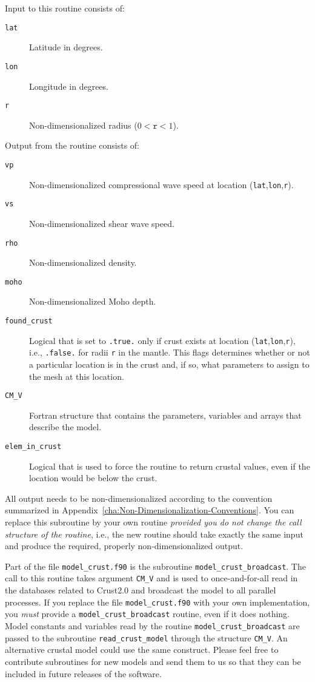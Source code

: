 \noindent
Input to this routine consists of:
\begin{description}
\item [{\texttt{lat}}] Latitude in degrees.
\item [{\texttt{lon}}] Longitude in degrees.
\item [{\texttt{r}}] Non-dimensionalized radius ($0<\texttt{r}<1$).
\end{description}
%
Output from the routine consists of:
\begin{description}
\item [{\texttt{vp}}] Non-dimensionalized compressional wave speed at location
(\texttt{lat},\texttt{lon},\texttt{r}).
\item [{\texttt{vs}}] Non-dimensionalized shear wave speed.
\item [{\texttt{rho}}] Non-dimensionalized density.
\item [{\texttt{moho}}] Non-dimensionalized Moho depth.
\item [{\texttt{found\_crust}}] Logical that is set to \texttt{.true.}
only if crust exists at location (\texttt{lat},\texttt{lon},\texttt{r}),
i.e., \texttt{.false.} for radii \texttt{r} in the mantle. This flags
determines whether or not a particular location is in the crust and,
if so, what parameters to assign to the mesh at this location.
\item [{\texttt{CM\_V}}] Fortran structure that contains the parameters,
variables and arrays that describe the model.
\item [{\texttt{elem\_in\_crust}}] Logical that is used to force the
routine to return crustal values, even if the location would
be below the crust.
\end{description}


All output needs to be non-dimensionalized according to the convention
summarized in Appendix~\ref{cha:Non-Dimensionalization-Conventions}.
You can replace this subroutine by your own routine \textit{provided
you do not change the call structure of the routine}, i.e., the new
routine should take exactly the same input and produce the required,
properly non-dimensionalized output.\newline


Part of the file \texttt{model\_crust.f90} is the subroutine \texttt{model\_crust\_broadcast}.
The call to this routine takes argument \texttt{CM\_V} and is used
to once-and-for-all read in the databases related to Crust2.0 and
broadcast the model to all parallel processes. If
you replace the file \texttt{model\_crust.f90} with your own implementation,
you \textit{must} provide a \texttt{model\_crust\_broadcast} routine,
even if it does nothing. Model constants and variables read by the
routine \texttt{model\_crust\_broadcast} are passed to the subroutine
\texttt{read\_crust\_model} through the structure \texttt{CM\_V}.
An alternative crustal model could use the same construct. Please
feel free to contribute subroutines for new models and send them to
us so that they can be included in future releases of the software.\newline


